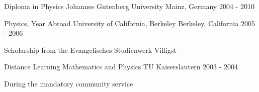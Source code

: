 
\begin{cventries}

  \cventry
    {Diploma in Physics}
    {Johannes Gutenberg University}
    {Mainz, Germany}
    {2004 - 2010}
    {}

  \cventry
    {Physics, Year Abroad}
    {University of California, Berkeley}
    {Berkeley, California}
    {2005 - 2006}
    {
      \begin{cvitems}
        \item {Scholarship from the Evangelisches Studienwerk Villigst}
      \end{cvitems}
    }

  \cventry
    {Distance Learning Mathematics and Physics}
    {TU Kaiserslautern}
    {}
    {2003 - 2004}
    {
      \begin{cvitems}
        \item {During the mandatory community service}
      \end{cvitems}
    }


\end{cventries}
